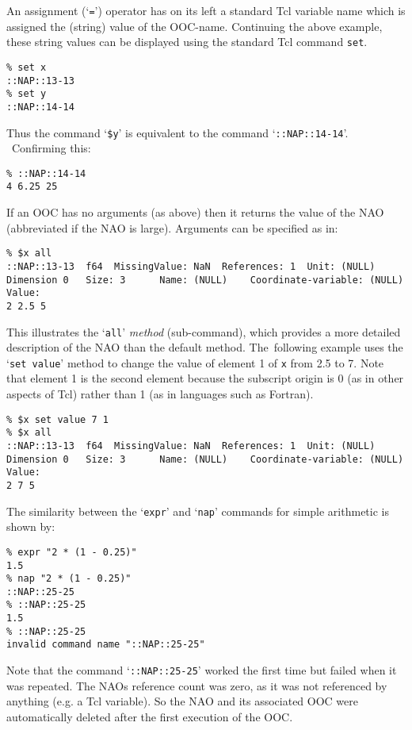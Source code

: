 An assignment (`\texttt{=}') operator has on its left a standard Tcl
    variable name which is assigned the (string) value of the OOC-name.
    Continuing the above example, these string values can be displayed
    using the standard Tcl command 
    \texttt{set}.
\begin{verbatim}
% set x
::NAP::13-13
% set y
::NAP::14-14
\end{verbatim}

    

Thus the command `\texttt{\$y}' is equivalent to the command `\texttt{::NAP::14-14}'. \  Confirming this:
\begin{verbatim}
% ::NAP::14-14
4 6.25 25
\end{verbatim}

If an OOC has no arguments (as above) then it returns the value
    of the NAO (abbreviated if the NAO is large). Arguments can be
    specified as in:
\begin{verbatim}
% $x all
::NAP::13-13  f64  MissingValue: NaN  References: 1  Unit: (NULL)
Dimension 0   Size: 3      Name: (NULL)    Coordinate-variable: (NULL)
Value:
2 2.5 5
\end{verbatim}

This illustrates the `\texttt{all}' 
    \emph{method} (sub-command), which provides a more detailed
    description of the NAO than the default method. The\  following
    example uses the `\texttt{set value}' method to change the value of element
    1 of 
    \texttt{x} from 2.5 to 7. Note that element 1 is the second
    element because the subscript origin is 0 (as in other aspects of
    Tcl) rather than 1 (as in languages such as Fortran).
\begin{verbatim}
% $x set value 7 1
% $x all
::NAP::13-13  f64  MissingValue: NaN  References: 1  Unit: (NULL)
Dimension 0   Size: 3      Name: (NULL)    Coordinate-variable: (NULL)
Value:
2 7 5
\end{verbatim}

    

The similarity between the `\texttt{expr}' and `\texttt{nap}' commands for simple arithmetic 
is shown by:
\begin{verbatim}
% expr "2 * (1 - 0.25)"
1.5
% nap "2 * (1 - 0.25)"
::NAP::25-25
% ::NAP::25-25
1.5
% ::NAP::25-25
invalid command name "::NAP::25-25"
\end{verbatim}

Note that the command `\texttt{::NAP::25-25}' worked the first time but failed
    when it was repeated. The NAOs reference count was zero, as it was
    not referenced by anything (e.g. a Tcl variable). So the NAO and
    its associated OOC were automatically deleted after the first
    execution of the OOC.
    

